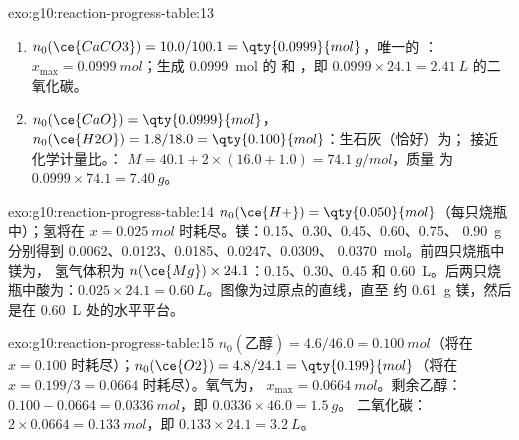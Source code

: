 \begin{solution}{exo:g10:reaction-progress-table:13}
\begin{enumerate}
  \item $n_0(\ce{CaCO3}) = 10.0 / 100.1 = \qty{0.0999}{mol}$，唯一的
        ：$x_{\max} = \qty{0.0999}{mol}$；生成
        \qty{0.0999}{mol} 的  和 ，即
        $0.0999 \times 24.1 = \qty{2.41}{L}$ 的二氧化碳。
  \item $n_0(\ce{CaO}) = \qty{0.0999}{mol}$，$n_0(\ce{H2O}) = 1.8 / 18.0
        = \qty{0.100}{mol}$：生石灰（恰好）为；
        接近化学计量比。：
        $M = 40.1 + 2 \times (16.0 + 1.0) = \qty{74.1}{g/mol}$，质量
        为 $0.0999 \times 74.1 = \qty{7.40}{g}$。
\end{enumerate}
\end{solution}

\begin{solution}{exo:g10:reaction-progress-table:14}
$n_0(\ce{H+}) = \qty{0.050}{mol}$（每只烧瓶中）；氢将在
$x = \qty{0.025}{mol}$ 时耗尽。镁：0.15、0.30、0.45、0.60、0.75、
\qty{0.90}{g} 分别得到 0.0062、0.0123、0.0185、0.0247、0.0309、
\qty{0.0370}{mol}。前四只烧瓶中镁为，
氢气体积为 $n(\ce{Mg}) \times 24.1$：0.15、0.30、0.45 和
\qty{0.60}{L}。后两只烧瓶中酸为：$0.025 \times 24.1
= \qty{0.60}{L}$。图像为过原点的直线，直至
约 \qty{0.61}{g} 镁，然后是在
\qty{0.60}{L} 处的水平平台。
\end{solution}

\begin{solution}{exo:g10:reaction-progress-table:15}
$n_0(\text{乙醇}) = 4.6 / 46.0 = \qty{0.100}{mol}$（将在
$x = 0.100$ 时耗尽）；$n_0(\ce{O2}) = 4.8 / 24.1 = \qty{0.199}{mol}$（将在
$x = 0.199/3 = 0.0664$ 时耗尽）。氧气为，
$x_{\max} = \qty{0.0664}{mol}$。剩余乙醇：$0.100 - 0.0664 =
\qty{0.0336}{mol}$，即 $0.0336 \times 46.0 = \qty{1.5}{g}$。
二氧化碳：$2 \times 0.0664 = \qty{0.133}{mol}$，即
$0.133 \times 24.1 = \qty{3.2}{L}$。
\end{solution}

